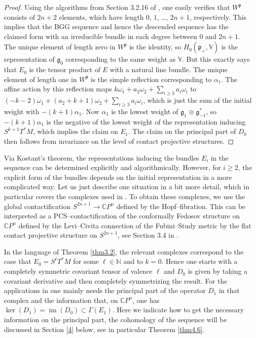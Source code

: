 \documentclass[12pt,a4paper]{amsart}
\def\frak{\mathfrak}
\def\Bbb{\mathbb}
\newcommand{\al}{\alpha}
\newcommand{\om}{\omega}
\newcommand{\Ga}{\Gamma}
\newcommand{\im}{\operatorname{im}}
\newcounter{theorem}
\numberwithin{theorem}{section}
\theoremstyle{definition}
\theoremstyle{remark}
\begin{document}
\begin{proof}
Using the algorithms from Section 3.2.16 of \cite{book}, one easily
verifies that $W^{\frak p}$ consists of $2n+2$ elements, which have
length $0$, $1$, \dots, $2n+1$, respectively. This implies that the
BGG sequence and hence the descended sequence has the claimed form
with an irreducible bundle in each degree between $0$ and $2n+1$. The
unique element of length zero in $W^{\frak p}$ is the identity, so
$H_0(\frak p_+,\Bbb V)$ is the representation of $\frak g_0$
corresponding to the same weight as $\Bbb V$. But this exactly says
that $E_0$ is the tensor product of $E$ with a natural line
bundle. The unique element of length one in $W^{\frak p}$ is the
simple reflection corresponding to $\al_1$. The affine action by this
reflection maps $k\om_1+a_2\om_2+\sum_{i\geq 3}a_i\om_i$ to
$(-k-2)\om_1+(a_2+k+1)\om_2 +\sum_{i\geq 3}a_i\om_i$, which is just
the sum of the initial weight with $-(k+1)\al_1$. Now $\al_1$ is the
lowest weight of $\frak g_1\cong\frak g_{-1}^*$, so $-(k+1)\al_1$ is
the negative of the lowest weight of the representation inducing
$S^{k+1}T^*M$, which implies the claim on $E_1$. The claim on the
principal part of $D_0$ then follows from invariance on the level of
contact projective structures.
\end{proof}

Via Kostant's theorem, the representations inducing the bundles $E_i$
in the sequence can be determined explicitly and
algorithmically. However, for $i\geq 2$, the explicit form of the
bundles depends on the initial representation in a more complicated
way. Let us just describe one situation in a bit more detail, which in
particular covers the complexes used in \cite{E-G}. To obtain these
complexes, we use the global contactification $S^{2n+1}\to\Bbb CP^n$
defined by the Hopf--fibration. This can be interpreted as a
PCS--contactification of the conformally Fedosov structure on $\Bbb
CP^n$ defined by the Levi--Civita connection of the Fubini--Study
metric by the flat contact projective structure on $S^{2n+1}$, see
Section 3.4 in \cite{PCS2}. 

In the language of Theorem \ref{thm3.2}, the relevant complexes
correspond to the case that $E_0=S^\ell T^*M$ for some $\ell\in\Bbb N$
and to $k=0$. Hence one starts with a completely symmetric covariant
tensor of valence $\ell$ and $D_0$ is given by taking a covariant
derivative and then completely symmetrizing the result. For the
applications in \cite{E-G} one mainly needs the principal part of the
operator $D_1$ in that complex and the information that, on $\mathbb
CP^n$, one has $\ker(D_1)=\im(D_0)\subset \Ga(E_1)$. Here we indicate
how to get the necessary information on the principal part, the
cohomology of the sequence will be discussed in Section \ref{4} below,
see in particular Theorem \ref{thm4.6}.
\end{document}
